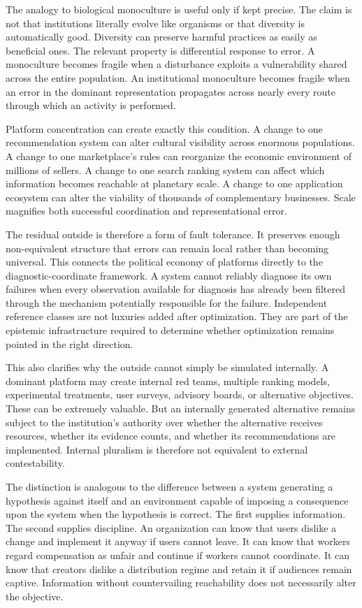 \documentclass[11pt]{article}
\begin{document}
The analogy to biological monoculture is useful only if kept precise. The claim is not that institutions literally evolve like organisms or that diversity is automatically good. Diversity can preserve harmful practices as easily as beneficial ones. The relevant property is differential response to error. A monoculture becomes fragile when a disturbance exploits a vulnerability shared across the entire population. An institutional monoculture becomes fragile when an error in the dominant representation propagates across nearly every route through which an activity is performed.

Platform concentration can create exactly this condition. A change to one recommendation system can alter cultural visibility across enormous populations. A change to one marketplace's rules can reorganize the economic environment of millions of sellers. A change to one search ranking system can affect which information becomes reachable at planetary scale. A change to one application ecosystem can alter the viability of thousands of complementary businesses. Scale magnifies both successful coordination and representational error.

The residual outside is therefore a form of fault tolerance. It preserves enough non-equivalent structure that errors can remain local rather than becoming universal. This connects the political economy of platforms directly to the diagnostic-coordinate framework. A system cannot reliably diagnose its own failures when every observation available for diagnosis has already been filtered through the mechanism potentially responsible for the failure. Independent reference classes are not luxuries added after optimization. They are part of the epistemic infrastructure required to determine whether optimization remains pointed in the right direction.

This also clarifies why the outside cannot simply be simulated internally. A dominant platform may create internal red teams, multiple ranking models, experimental treatments, user surveys, advisory boards, or alternative objectives. These can be extremely valuable. But an internally generated alternative remains subject to the institution's authority over whether the alternative receives resources, whether its evidence counts, and whether its recommendations are implemented. Internal pluralism is therefore not equivalent to external contestability.

The distinction is analogous to the difference between a system generating a hypothesis against itself and an environment capable of imposing a consequence upon the system when the hypothesis is correct. The first supplies information. The second supplies discipline. An organization can know that users dislike a change and implement it anyway if users cannot leave. It can know that workers regard compensation as unfair and continue if workers cannot coordinate. It can know that creators dislike a distribution regime and retain it if audiences remain captive. Information without countervailing reachability does not necessarily alter the objective.
\end{document}
